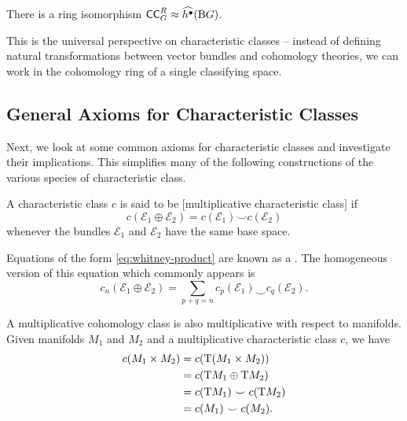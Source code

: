 \begin{theorem}\label{thm:universal-characteristic-classes}
	There is a ring isomorphism $\mathsf{CC}^R_G\approx \widehat{h^\bullet}(\mathrm{B} G)$.
\end{theorem}

This is the universal perspective on characteristic classes -- instead of defining natural transformations between vector bundles and cohomology theories, we can work in the cohomology ring of a single classifying space.

\subsection{General Axioms for Characteristic Classes}

Next, we look at some common axioms for characteristic classes and investigate their implications. This simplifies many of the following constructions of the various species of characteristic class.

\begin{definition}
	A characteristic class $c$ is said to be [multiplicative characteristic class] if \begin{equation}\label{eq:whitney-product}
		c(\mathcal{E}_1\oplus \mathcal{E}_2)=c(\mathcal{E}_1)\smile c(\mathcal{E}_2)
	\end{equation}
	whenever the bundles $\mathcal{E}_1$ and $\mathcal{E}_2$ have the same base space.
\end{definition}

Equations of the form \cref{eq:whitney-product} are known as a . The homogeneous version of this equation which commonly appears is
\[
	c_n(\mathcal{E}_1\oplus \mathcal{E}_2) = \sum_{p+q=n}c_p(\mathcal{E}_1)\smile c_q(\mathcal{E}_2).
\]

\begin{remark*}
	A multiplicative cohomology class is also multiplicative with respect to manifolds. Given manifolds $M_1$ and $M_2$ and a multiplicative characteristic class $c$, we have
	\[
		\begin{aligned}
			c(M_1\times M_2) & = c(\mathrm{T}(M_1\times M_2))      \\
			                 & = c(\mathrm{T} M_1\oplus \mathrm{T} M_2)    \\
			                 & = c(\mathrm{T} M_1)\smile c(\mathrm{T} M_2) \\
			                 & = c(M_1)\smile c(M_2).
		\end{aligned}
	\]
\end{remark*}

